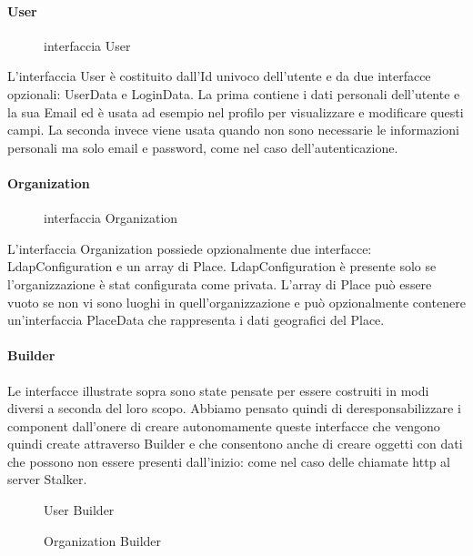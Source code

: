 \documentclass[../../manuale-manutentore.tex]{subfiles}
\begin{document}
\paragraph{User}%
\label{par:webapp/user}
\begin{figure}[H]
  \centering
  \caption{interfaccia User}%
  \label{fig:web-app-user}
\end{figure}
L'interfaccia User è costituito dall'Id univoco dell'utente e da due interfacce opzionali: UserData e LoginData.
La prima contiene i dati personali dell'utente e la sua Email ed è usata ad esempio nel profilo per visualizzare e modificare questi campi.
La seconda invece viene usata quando non sono necessarie le informazioni personali ma solo email e password, come nel caso dell'autenticazione.

\paragraph{Organization}%
\label{par:webapp/organization}
\begin{figure}[H]
  \centering
  \caption{interfaccia Organization}%
  \label{fig:web-app-organization}
\end{figure}
L'interfaccia Organization possiede opzionalmente due interfacce: LdapConfiguration e un array di Place.
LdapConfiguration è presente solo se l'organizzazione è stat configurata come privata.
L'array di Place può essere vuoto se non vi sono luoghi in quell'organizzazione e può opzionalmente contenere un'interfaccia PlaceData che rappresenta i dati geografici del Place.

\paragraph{Builder}%
\label{par:builder}
Le interfacce illustrate sopra sono state pensate per essere costruiti in modi diversi a seconda del loro scopo.
Abbiamo pensato quindi di deresponsabilizzare i component dall'onere di creare autonomamente queste interfacce che vengono quindi create attraverso Builder e che consentono anche di creare oggetti con dati che possono non essere presenti dall'inizio: come nel caso delle chiamate http al server Stalker.
\begin{figure}[H]
  \centering
  \caption{User Builder}%
  \label{fig:web-app-user-builder}
\end{figure}
\begin{figure}[H]
  \centering
  \caption{Organization Builder}%
  \label{fig:web-app-organization-builder}
\end{figure}
\end{document}
